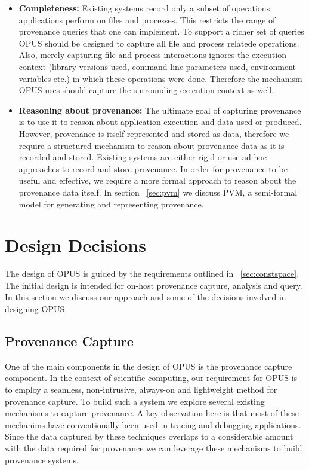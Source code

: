 \documentclass[withindex,glossary]{cam-thesis}
\begin{document}
\begin{itemize}
\item \textbf{Completeness:} 
Existing systems record only a subset of operations applications perform on files and processes. This restricts the range of provenance queries that one can implement. To support a richer set of queries OPUS should be designed to capture all file and process relatede operations. Also, merely capturing file and process interactions ignores the execution context (library versions used, command line parameters used, environment variables etc.) in which these operations were done. Therefore the mechanism OPUS uses should capture the surrounding execution context as well. 

\item \textbf{Reasoning about provenance:}
The ultimate goal of capturing provenance is to use it to reason about application execution and data used or produced. However, provenance is itself represented and stored as data, therefore we require a structured mechanism to reason about provenance data as it is recorded and stored. Existing systems are either rigid or use ad-hoc approaches to record and store provenance. In order for provenance to be useful and effective, we require a more formal approach to reason about the provenance data itself. In section ~\ref{sec:pvm} we discuss PVM, a semi-formal model for generating and representing provenance.

\end{itemize}

\section{Design Decisions} 
The design of OPUS is guided by the requirements outlined in ~\ref{sec:constspace}.
The initial design is intended for on-host provenance capture, analysis and query.
In this section we discuss our approach and some of the decisions involved in designing OPUS.


\subsection{Provenance Capture}
One of the main components in the design of OPUS is the provenance capture component.
In the context of scientific computing, our requirement for OPUS is to employ a seamless, non-intrusive, always-on and lightweight method for provenance capture.
To build such a system we explore several existing mechanisms to capture provenance.
A key observation here is that most of these mechanims have conventionally been used in tracing and debugging applications.
Since the data captured by these techniques overlaps to a considerable amount with the data required for provenance we can leverage these mechanisms to build provenance systems.
\end{document}
